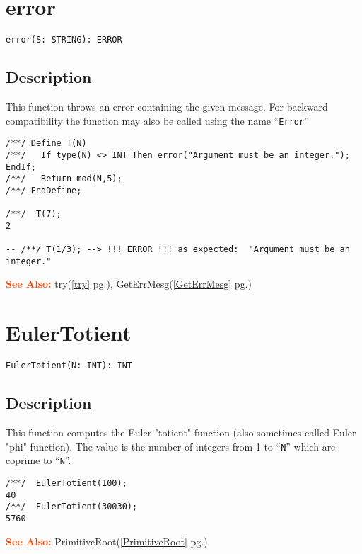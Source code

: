 \documentclass[a4paper]{mybook}
\newenvironment{command}{}{} %
\newcommand\SeeAlso{\par\textcolor{OrangeRed}{\textbf{\large See Also: }}}
\begin{document}
\section{error}
\label{error}
\begin{command} %


\begin{Verbatim}[label=syntax, rulecolor=\color{MidnightBlue},
frame=single]
error(S: STRING): ERROR
\end{Verbatim}


\subsection*{Description}

This function throws an error containing the given message.
For backward compatibility the function may also be called using
the name ``\verb&Error&''
\begin{Verbatim}[label=example, rulecolor=\color{PineGreen}, frame=single]
/**/ Define T(N)
/**/   If type(N) <> INT Then error("Argument must be an integer."); EndIf;
/**/   Return mod(N,5);
/**/ EndDefine;

/**/  T(7);
2

-- /**/ T(1/3); --> !!! ERROR !!! as expected:  "Argument must be an integer."
\end{Verbatim}


\SeeAlso %
  try(\ref{try} pg.\pageref{try}), 
    GetErrMesg(\ref{GetErrMesg} pg.\pageref{GetErrMesg})
\end{command} %

\section{EulerTotient}
\label{EulerTotient}
\begin{command} %


\begin{Verbatim}[label=syntax, rulecolor=\color{MidnightBlue},
frame=single]
EulerTotient(N: INT): INT
\end{Verbatim}


\subsection*{Description}

This function computes the Euler "totient" function (also sometimes
called Euler "phi" function).  The value is the number of
integers from 1 to ``\verb&N&'' which are coprime to ``\verb&N&''.
\begin{Verbatim}[label=example, rulecolor=\color{PineGreen}, frame=single]
/**/  EulerTotient(100);
40  
/**/  EulerTotient(30030);
5760
\end{Verbatim}


\SeeAlso %
  PrimitiveRoot(\ref{PrimitiveRoot} pg.\pageref{PrimitiveRoot})
\end{command} %
\end{document}

